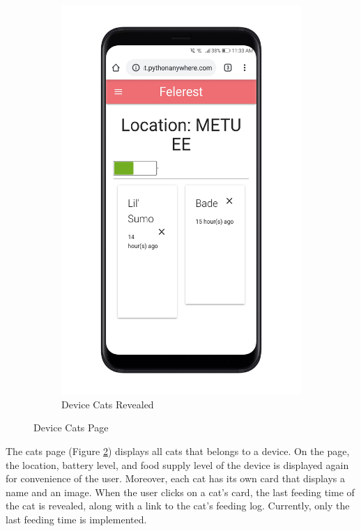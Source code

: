 \begin{figure}[ht]
\begin{subfigure}{0.5\textwidth}
    \includegraphics[width=\linewidth]{content/030_system_architecture/img/user_interface/cats_revealed.png}
    \caption{Device Cats Revealed}
    \label{fig:ui-cats-revealed}
\end{subfigure}
\caption{Device Cats Page}
    \label{fig:ui-cats-combined}
\end{figure}

The cats page (Figure \ref{fig:ui-cats-combined}) displays all cats that belongs to a device. On the page, the location, battery level, and food supply level of the device is displayed again for convenience of the user. Moreover, each cat has its own card that displays a name and an image. When the user clicks on a cat's card, the last feeding time of the cat is revealed, along with a link to the cat's feeding log. Currently, only the last feeding time is implemented.


